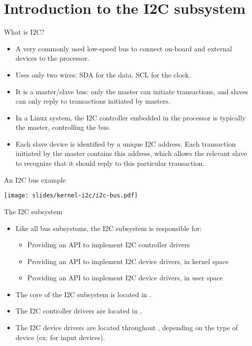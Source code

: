 \section{Introduction to the I2C subsystem}

\begin{frame}{What is I2C?}
  \begin{itemize}
  \item A very commonly used low-speed bus to connect on-board
    and external devices to the processor.
  \item Uses only two wires: SDA for the data, SCL for the clock.
  \item It is a master/slave bus: only the master can initiate
    transactions, and slaves can only reply to transactions initiated
    by masters.
  \item In a Linux system, the I2C controller embedded in the
    processor is typically the master, controlling the bus.
  \item Each slave device is identified by a unique I2C address. Each
    transaction initiated by the master contains this address, which
    allows the relevant slave to recognize that it should reply to
    this particular transaction.
  \end{itemize}
\end{frame}

\begin{frame}{An I2C bus example}
  \begin{center}
    \texttt{[image: slides/kernel-i2c/i2c-bus.pdf]}
  \end{center}
\end{frame}

\begin{frame}{The I2C subsystem}
  \begin{itemize}
  \item Like all bus subsystems, the I2C subsystem is responsible for:
    \begin{itemize}
    \item Providing an API to implement I2C controller drivers
    \item Providing an API to implement I2C device drivers, in kernel space
    \item Providing an API to implement I2C device drivers, in user space
    \end{itemize}
  \item The core of the I2C subsystem is located in
    .
  \item The I2C controller drivers are located in
    .
  \item The I2C device drivers are located throughout
    , depending on the type of device (ex:
     for input devices).
  \end{itemize}
\end{frame}

